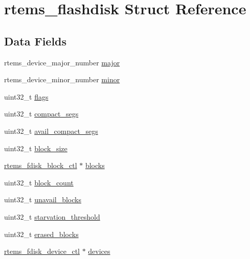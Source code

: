 \hypertarget{structrtems__flashdisk}{}\section{rtems\+\_\+flashdisk Struct Reference}
\label{structrtems__flashdisk}
\subsection*{Data Fields}
\begin{DoxyCompactItemize}
\item 
rtems\+\_\+device\+\_\+major\+\_\+number \mbox{\hyperlink{structrtems__flashdisk_a2147b5538bd1647e420519c11c29ebcb}{major}}
\item 
rtems\+\_\+device\+\_\+minor\+\_\+number \mbox{\hyperlink{structrtems__flashdisk_ab103f6c221265be1c19f5f7b43e39cc6}{minor}}
\item 
uint32\+\_\+t \mbox{\hyperlink{structrtems__flashdisk_a0be9bcc85eaf41c14c538c14d5ead3a3}{flags}}
\item 
uint32\+\_\+t \mbox{\hyperlink{structrtems__flashdisk_acb5f24b8143d196887ce768b82ac780a}{compact\+\_\+segs}}
\item 
uint32\+\_\+t \mbox{\hyperlink{structrtems__flashdisk_af447351dbbc46ee4bf84f5a2ba39466f}{avail\+\_\+compact\+\_\+segs}}
\item 
uint32\+\_\+t \mbox{\hyperlink{structrtems__flashdisk_a49d6ba40e9f0b35165fc54aca51e4f9f}{block\+\_\+size}}
\item 
\mbox{\hyperlink{structrtems__fdisk__block__ctl}{rtems\+\_\+fdisk\+\_\+block\+\_\+ctl}} $\ast$ \mbox{\hyperlink{structrtems__flashdisk_a15f92f586a61129bd8cb99f12bbcd01d}{blocks}}
\item 
uint32\+\_\+t \mbox{\hyperlink{structrtems__flashdisk_aba4f374633a9848c3f88d9c3739037ce}{block\+\_\+count}}
\item 
uint32\+\_\+t \mbox{\hyperlink{structrtems__flashdisk_a638b619494771a304821684cc70be96c}{unavail\+\_\+blocks}}
\item 
uint32\+\_\+t \mbox{\hyperlink{structrtems__flashdisk_acd944a0927630c553111d652de53a8cc}{starvation\+\_\+threshold}}
\item 
uint32\+\_\+t \mbox{\hyperlink{structrtems__flashdisk_a6020f878c71c545f444c813a777c9c37}{erased\+\_\+blocks}}
\item 
\mbox{\hyperlink{structrtems__fdisk__device__ctl}{rtems\+\_\+fdisk\+\_\+device\+\_\+ctl}} $\ast$ \mbox{\hyperlink{structrtems__flashdisk_ac8a0e5bcd9de5603536bfb65c84df90c}{devices}}

\end{DoxyCompactItemize}
